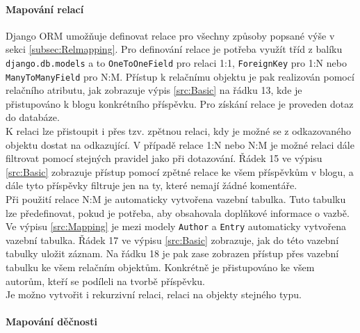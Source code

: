 \documentclass[ing,male,java,dept456]{diploma}						%
\begin{document}
\paragraph{Mapování relací} Django ORM umožňuje definovat relace pro všechny způsoby popsané výše v sekci \ref{subsec:Relmapping}. Pro definování relace je potřeba využít tříd z balíku \lstinline[style=custompython]|django.db.models| a to \lstinline[style=custompython]|OneToOneField| pro relaci 1:1, \lstinline[style=custompython]|ForeignKey| pro 1:N nebo \lstinline[style=custompython]|ManyToManyField| pro N:M. Přístup k relačnímu objektu je pak realizován pomocí relačního atributu, jak zobrazuje výpis \ref{src:Basic} na řádku 13, kde je přistupováno k blogu konkrétního příspěvku. Pro získání relace je proveden dotaz do databáze. \\
K relaci lze přistoupit i přes tzv. zpětnou relaci, kdy je možné se z odkazovaného objektu dostat na odkazující. V případě relace 1:N nebo N:M je možné relaci dále filtrovat pomocí stejných pravidel jako při dotazování. Řádek 15 ve výpisu \ref{src:Basic} zobrazuje přístup pomocí zpětné relace ke všem příspěvkům v blogu, a dále tyto příspěvky filtruje jen na ty, které nemají žádné komentáře.\\
Při použití relace N:M je automaticky vytvořena vazební tabulka. Tuto tabulku lze předefinovat, pokud je potřeba, aby obsahovala doplňkové informace o vazbě. Ve výpisu \ref{src:Mapping} je mezi modely \lstinline[style=inlinepython]|Author| a \lstinline[style=inlinepython]|Entry| automaticky vytvořena vazební tabulka. Řádek 17 ve výpisu \ref{src:Basic} zobrazuje, jak do této vazební tabulky uložit záznam. Na řádku 18 je pak zase zobrazen přístup přes vazební tabulku ke všem relačním objektům. Konkrétně je přistupováno ke všem autorům, kteří se podíleli na tvorbě příspěvku. \\
Je možno vytvořit i rekurzivní relaci, relaci na objekty stejného typu. \\

\paragraph{Mapování děčnosti}
\end{document}
